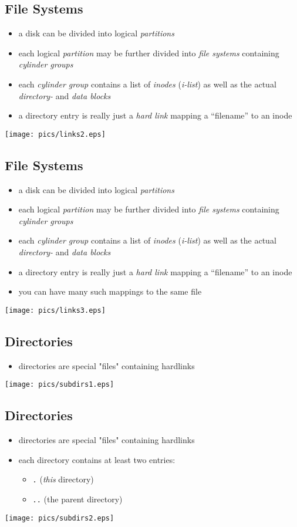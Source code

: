 \documentclass[xga]{xdvislides}
\begin{document}
\subsection{File Systems}
\begin{itemize}
	\item a disk can be divided into logical {\em partitions}
	\item each logical {\em partition} may be further divided into
		{\em file systems} containing {\em cylinder groups}
	\item each {\em cylinder group} contains a list of {\em inodes} ({\em i-list})
		as well as the actual {\em directory-} and {\em data blocks}
	\item a directory entry is really just a {\em hard link} mapping a
		``filename'' to an inode
\end{itemize}
\texttt{[image: pics/links2.eps]}

\subsection{File Systems}
\begin{itemize}
	\item a disk can be divided into logical {\em partitions}
	\item each logical {\em partition} may be further divided into
		{\em file systems} containing {\em cylinder groups}
	\item each {\em cylinder group} contains a list of {\em inodes} ({\em i-list})
		as well as the actual {\em directory-} and {\em data blocks}
	\item a directory entry is really just a {\em hard link} mapping a
		``filename'' to an inode
	\item you can have many such mappings to the same file
\end{itemize}
\texttt{[image: pics/links3.eps]}

\subsection{Directories}
\begin{itemize}
	\item directories are special "files" containing hardlinks
\end{itemize}
\texttt{[image: pics/subdirs1.eps]}

\subsection{Directories}
\begin{itemize}
	\item directories are special "files" containing hardlinks
	\item each directory contains at least two entries:
		\begin{itemize}
			\item {\tt .} ({\em this} directory)
			\item {\tt ..} (the parent directory)
		\end{itemize}
\end{itemize}
\texttt{[image: pics/subdirs2.eps]}
\end{document}
